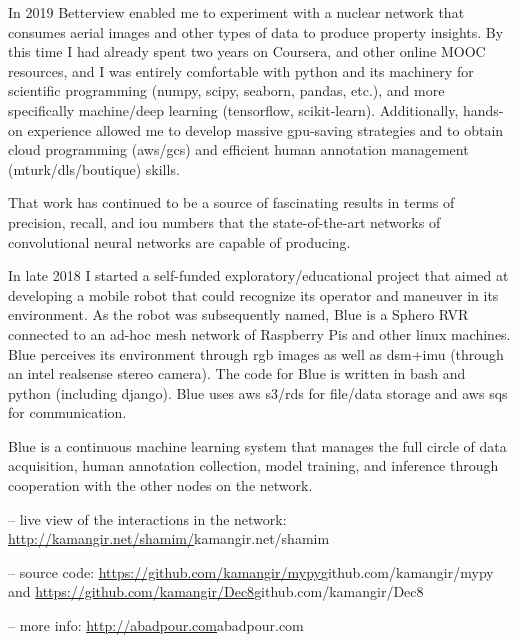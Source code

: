 \vspace{0.5cm}
In 2019 Betterview enabled me to experiment with a nuclear network that consumes aerial images and other types of data to produce property insights. By this time I had already spent two years on Coursera, and other online MOOC resources, and I was entirely comfortable with python and its machinery for scientific programming (numpy, scipy, seaborn, pandas, etc.), and more specifically machine/deep learning (tensorflow, scikit-learn). Additionally, hands-on experience allowed me to develop massive gpu-saving strategies and to obtain cloud programming (aws/gcs) and efficient human annotation management (mturk/dls/boutique) skills. 

\vspace{0.5cm}
That work has continued to be a source of fascinating results in terms of precision, recall, and iou numbers that the state-of-the-art networks of convolutional neural networks are capable of producing.

\vspace{0.5cm}
In late 2018 I started a self-funded exploratory/educational project that aimed at developing a mobile robot that could recognize its operator and maneuver in its environment. As the robot was subsequently named, Blue is a Sphero RVR connected to an ad-hoc mesh network of Raspberry Pis and other linux machines. Blue perceives its environment through rgb images as well as dsm+imu (through an intel realsense stereo camera). The code for Blue is written in bash and python (including django). Blue uses aws s3/rds for file/data storage and aws sqs for communication. 

\vspace{0.5cm}
Blue is a continuous machine learning system that manages the full circle of data acquisition, human annotation collection, model training, and inference through cooperation with the other nodes on the network. 

-- live view of the interactions in the network: \url{http://kamangir.net/shamim/}{kamangir.net/shamim} 

-- source code: \url{https://github.com/kamangir/mypy}{github.com/kamangir/mypy} and \url{https://github.com/kamangir/Dec8}{github.com/kamangir/Dec8}

\vspace{0.5cm}
-- more info: \url{http://abadpour.com}{abadpour.com}

\vspace{1.5cm}
